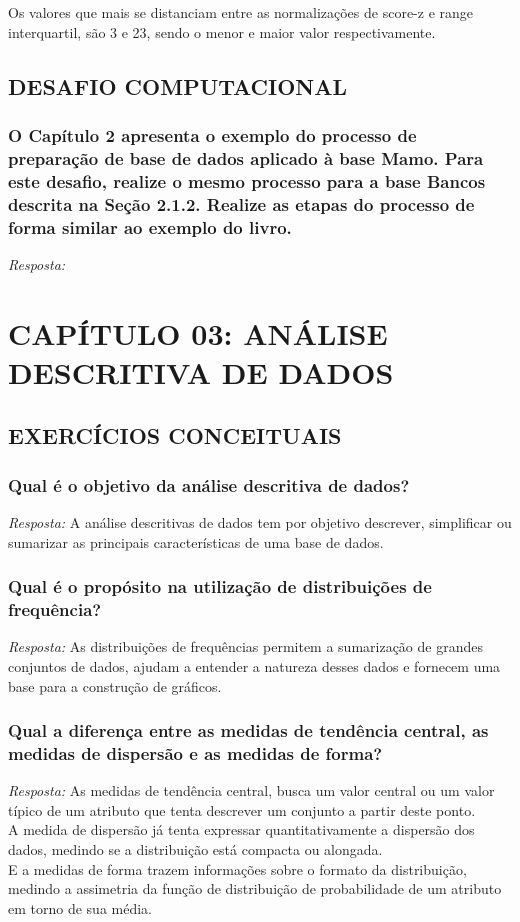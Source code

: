 \documentclass{article}
\begin{document}
Os valores que mais se distanciam entre as normalizações de score-z e range interquartil, são 3 e 23, sendo o menor e maior valor respectivamente. 

\subsection{DESAFIO COMPUTACIONAL}
\subsubsection{O Capítulo 2 apresenta o exemplo do processo de preparação de base de dados aplicado à base Mamo. Para este desafio, realize o mesmo processo para a base Bancos descrita na Seção 2.1.2. Realize as etapas do processo de forma similar ao exemplo do livro.}
\textit{Resposta:} 

\section{CAPÍTULO 03: ANÁLISE DESCRITIVA DE DADOS}
\subsection{EXERCÍCIOS CONCEITUAIS}
\subsubsection{Qual é o objetivo da análise descritiva de dados?}
\textit{Resposta:} A análise descritivas de dados tem por objetivo descrever, simplificar ou sumarizar as principais características de uma base de dados.

\subsubsection{Qual é o propósito na utilização de distribuições de frequência?}
\textit{Resposta:} As distribuições de frequências permitem a sumarização de grandes conjuntos de dados, ajudam a entender a natureza desses dados e fornecem uma base para a construção de gráficos.

\subsubsection{Qual a diferença entre as medidas de tendência central, as medidas de dispersão e as medidas de forma?}
\textit{Resposta:} As medidas de tendência central, busca um valor central ou um valor típico de um atributo que tenta descrever um conjunto a partir deste ponto. \\
A medida de dispersão já tenta expressar quantitativamente a dispersão dos dados, medindo se a distribuição está compacta ou alongada. \\
E a medidas de forma trazem informações sobre o formato da distribuição, medindo a assimetria da função de distribuição de probabilidade de um atributo em torno de sua média. 
\end{document}
